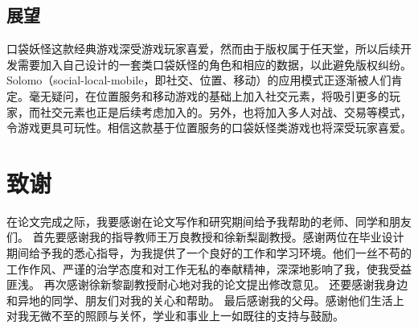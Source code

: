 \documentclass{article}
\begin{document}
\begin{CJK}{UTF8}{gbsn}
	\subsection{展望}
  口袋妖怪这款经典游戏深受游戏玩家喜爱，然而由于版权属于任天堂，所以后续开发需要加入自己设计的一套类口袋妖怪的角色和相应的数据，以此避免版权纠纷。Solomo（social-local-mobile，即社交、位置、移动）的应用模式正逐渐被人们肯定。毫无疑问，在位置服务和移动游戏的基础上加入社交元素，将吸引更多的玩家，而社交元素也正是后续考虑加入的。另外，也将加入多人对战、交易等模式，令游戏更具可玩性。相信这款基于位置服务的口袋妖怪类游戏也将深受玩家喜爱。


	\section{致谢}
  在论文完成之际，我要感谢在论文写作和研究期间给予我帮助的老师、同学和朋友们。
  首先要感谢我的指导教师王万良教授和徐新梨副教授。感谢两位在毕业设计期间给予我的悉心指导，为我提供了一个良好的工作和学习环境。他们一丝不苟的工作作风、严谨的治学态度和对工作无私的奉献精神，深深地影响了我，使我受益匪浅。
  再次感谢徐新黎副教授耐心地对我的论文提出修改意见。
  还要感谢我身边和异地的同学、朋友们对我的关心和帮助。
  最后感谢我的父母。感谢他们生活上对我无微不至的照顾与关怀，学业和事业上一如既往的支持与鼓励。
  

  

	\end{CJK}
\end{document}

